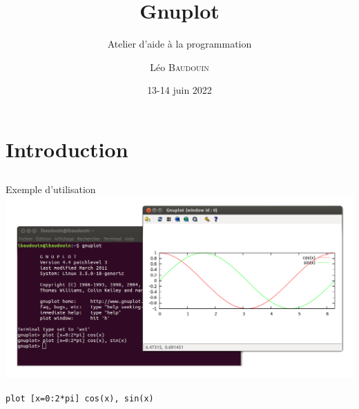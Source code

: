 \documentclass{beamer}
\title{Gnuplot}
\subtitle{Atelier d'aide à la programmation}
\author{L\'eo \textsc{Baudouin}}
\institute{
  {\url{baudouin.leo @ gmail.com}}
}
\date{13-14 juin 2022}
\begin{document}
\begin{frame}
  \titlepage
\end{frame}

\section{Introduction}
\subsection{}

\begin{frame}{Exemple d'utilisation}
\includegraphics[width=\linewidth]{images/gnuplot-exemple}

\begin{center}
\verb?plot [x=0:2*pi] cos(x), sin(x)?
\end{center}
\end{frame}
\end{document}
